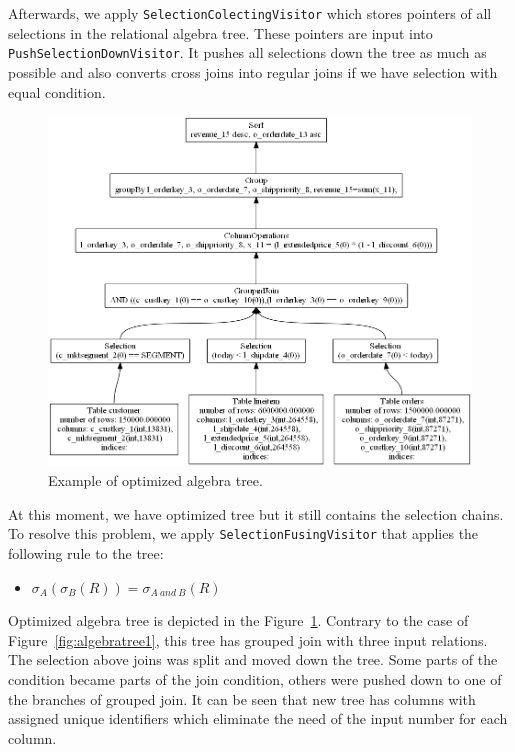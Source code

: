 Afterwards, we apply \texttt{SelectionColectingVisitor} which stores pointers of all selections in the relational algebra tree. These pointers are input into \texttt{Push\-Selection\-Down\-Visitor}. It pushes all selections down the tree as much as possible and also converts cross joins into regular joins if we have selection with equal condition.
\begin{figure}[h!]
  \centering
    \includegraphics[width=1.0\textwidth]{algebratree2}

      \caption{Example of optimized algebra tree.}
          \label{fig:algebratree2}
\end{figure}
At this moment, we have optimized tree but it still contains the selection chains. To resolve this problem, we apply \texttt{SelectionFusingVisitor} that applies the following rule to the tree:
\begin{itemize}
\item $\sigma_{A}(\sigma_{B}(R))=\sigma_{A~and~B}(R)$
\end{itemize}

Optimized algebra tree is depicted in the Figure~\ref{fig:algebratree2}. Contrary to the case of Figure~\ref{fig:algebratree1}, this tree has grouped join with three input relations. The selection above joins was split and moved down the tree. Some parts of the condition became parts of the join condition, others were pushed down to one of the branches of grouped join. It can be seen that new tree has columns with assigned unique identifiers which eliminate the need of the input number for each column.

